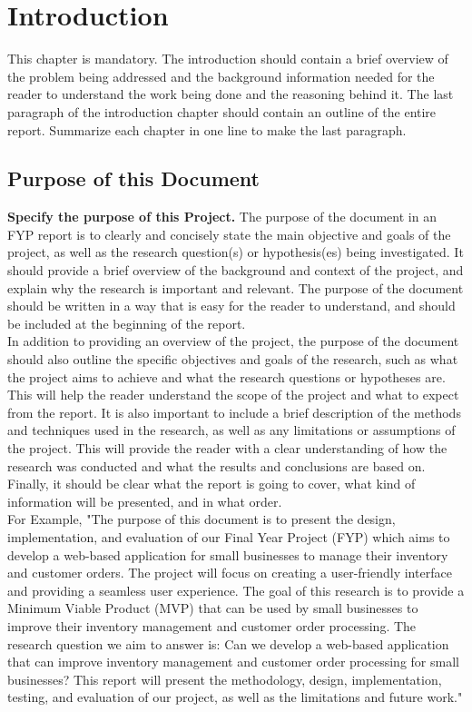 \chapter{Introduction}
This chapter is mandatory. The introduction should contain a brief overview of the problem being addressed and the background information needed for the reader to understand the work being done and the reasoning behind it.  
The last paragraph of the introduction chapter should contain an outline of the entire report.  Summarize each chapter in one line to make the last paragraph.
\section{Purpose of this Document}
\textbf{Specify the purpose of this Project.}
The purpose of the document in an FYP report is to clearly and concisely state the main objective and goals of the project, as well as the research question(s) or hypothesis(es) being investigated. It should provide a brief overview of the background and context of the project, and explain why the research is important and relevant. The purpose of the document should be written in a way that is easy for the reader to understand, and should be included at the beginning of the report.\\ In addition to providing an overview of the project, the purpose of the document should also outline the specific objectives and goals of the research, such as what the project aims to achieve and what the research questions or hypotheses are. This will help the reader understand the scope of the project and what to expect from the report. It is also important to include a brief description of the methods and techniques used in the research, as well as any limitations or assumptions of the project. This will provide the reader with a clear understanding of how the research was conducted and what the results and conclusions are based on. Finally, it should be clear what the report is going to cover, what kind of information will be presented, and in what order.\\
For Example, "The purpose of this document is to present the design, implementation, and evaluation of our Final Year Project (FYP) which aims to develop a web-based application for small businesses to manage their inventory and customer orders. The project will focus on creating a user-friendly interface and providing a seamless user experience. The goal of this research is to provide a Minimum Viable Product (MVP) that can be used by small businesses to improve their inventory management and customer order processing. The research question we aim to answer is: Can we develop a web-based application that can improve inventory management and customer order processing for small businesses? This report will present the methodology, design, implementation, testing, and evaluation of our project, as well as the limitations and future work."
